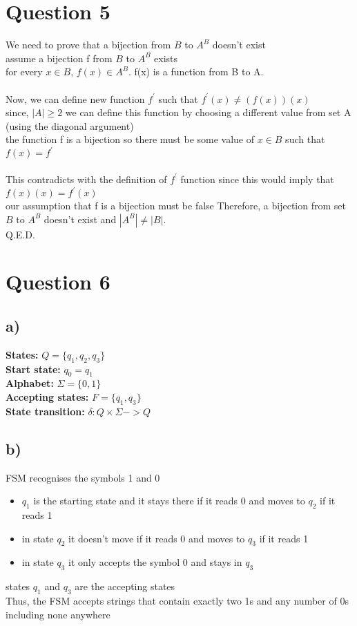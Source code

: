 \documentclass[11pt]{article}
\begin{document}
\section*{Question 5}
We need to prove that a bijection from $B$ to $A^B$ doesn't exist \\
assume a bijection f from $B$ to $A^B$ exists \\
for every $x \in B$, $f(x) \in A^B$. f(x) is a function from B to A. \\
\\
Now, we can define new function $f^\prime$ such that
$f^\prime (x) \neq (f(x))(x)$ \\
since, $|A| \geq 2$ we can define this function by choosing a different value
from set A (using the diagonal argument) \\
the function f is a bijection so there must be some value of $x \in B$
such that $f(x) = f^\prime$ \\
\\
This contradicts with the definition of $f^\prime$ function since this would imply
that $f(x)(x) = f^\prime(x)$ \\
our assumption that f is a bijection must be false
Therefore, a bijection from set $B$ to $A^B$ doesn't exist and $|A^B| \neq |B|$. \\
Q.E.D.

\section*{Question 6}
\subsection*{a)}
\textbf{States:} $Q = \{q_1, q_2, q_3\}$ \\
\textbf{Start state:} $q_0 = q_1$ \\
\textbf{Alphabet:} $\Sigma = \{0, 1\}$ \\
\textbf{Accepting states:} $F = \{q_1, q_3\}$ \\
\textbf{State transition:} $\delta : Q \times \Sigma -> Q$ \\

\subsection*{b)}
FSM recognises the symbols 1 and 0
\begin{itemize}
    \item $q_1$ is the starting state and it stays there if it reads 0 and moves to $q_2$ if it reads 1
    \item in state $q_2$ it doesn't move if it reads 0 and moves to $q_3$ if it reads 1
    \item in state $q_3$ it only accepts the symbol 0 and stays in $q_3$
\end{itemize}
states $q_1$ and $q_3$ are the accepting states \\
Thus, the FSM accepts strings that contain exactly two 1s and any number of 0s including none anywhere
\end{document}
